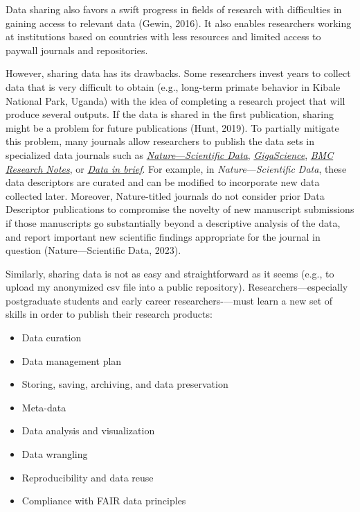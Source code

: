 \documentclass[
]{book}
\providecommand{\tightlist}{%
  \setlength{\itemsep}{0pt}\setlength{\parskip}{0pt}}
\theoremstyle{definition}
\theoremstyle{definition}
\theoremstyle{definition}
\theoremstyle{definition}
\theoremstyle{remark}
\begin{document}
Data sharing also favors a swift progress in fields of research with difficulties in gaining access to relevant data (Gewin, 2016). It also enables researchers working at institutions based on countries with less resources and limited access to paywall journals and repositories.

However, sharing data has its drawbacks. Some researchers invest years to collect data that is very difficult to obtain (e.g., long-term primate behavior in Kibale National Park, Uganda) with the idea of completing a research project that will produce several outputs. If the data is shared in the first publication, sharing might be a problem for future publications (Hunt, 2019). To partially mitigate this problem, many journals allow researchers to publish the data sets in specialized data journals such as \href{https://www.nature.com/sdata/}{\emph{Nature}---\emph{Scientific Data}}, \href{https://academic.oup.com/gigascience/pages/About}{\emph{GigaScience}}, \href{https://bmcresnotes.biomedcentral.com}{\emph{BMC Research Notes}}, or \href{https://www.journals.elsevier.com/data-in-brief}{\emph{Data in brief}}. For example, in \emph{Nature}---\emph{Scientific Data}, these data descriptors are curated and can be modified to incorporate new data collected later. Moreover, Nature-titled journals do not consider prior Data Descriptor publications to compromise the novelty of new manuscript submissions if those manuscripts go substantially beyond a descriptive analysis of the data, and report important new scientific findings appropriate for the journal in question (Nature---Scientific Data, 2023).

Similarly, sharing data is not as easy and straightforward as it seems (e.g., to upload my anonymized csv file into a public repository). Researchers---especially postgraduate students and early career researchers-\/---must learn a new set of skills in order to publish their research products:

\begin{itemize}
\tightlist
\item
  Data curation
\item
  Data management plan
\item
  Storing, saving, archiving, and data preservation
\item
  Meta-data
\item
  Data analysis and visualization
\item
  Data wrangling
\item
  Reproducibility and data reuse
\item
  Compliance with FAIR data principles
\end{itemize}
\end{document}
